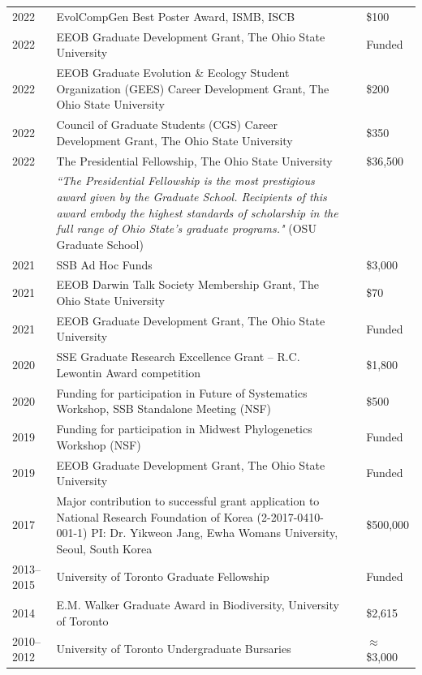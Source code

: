 \documentclass[11pt]{article}
\begin{document}
\begin{longtable}{p{}  p{} p{} p{} }%
2022 &	EvolCompGen Best Poster Award, ISMB, ISCB	& & \$100\\
2022 &	EEOB Graduate Development Grant, The Ohio State University	& & Funded\\
2022 &	EEOB Graduate Evolution \& Ecology Student Organization (GEES) Career Development Grant, The Ohio State University & & \$200\\
2022 & 	Council of Graduate Students (CGS) Career Development Grant, The Ohio State University & & \$350\\
2022 &	The Presidential Fellowship, The Ohio State University & & \$36,500\\
& \textit{``The Presidential Fellowship is the most prestigious award given by the Graduate School. Recipients of this award embody the highest standards of scholarship in the full range of Ohio State's graduate programs."} (OSU Graduate School) &&\\
2021 &	SSB Ad Hoc Funds	& & \$3,000\\
2021 &	EEOB Darwin Talk Society Membership Grant, The Ohio State University	& & \$70\\
2021 &	EEOB Graduate Development Grant, The Ohio State University	& & Funded\\
2020 &	SSE Graduate Research Excellence Grant – R.C. Lewontin Award competition	& & \$1,800 \\
2020 &	Funding for participation in Future of Systematics Workshop, SSB Standalone Meeting (NSF)	& & \$500\\
2019 &	Funding for participation in Midwest Phylogenetics Workshop (NSF)	& & Funded\\
2019 &	EEOB Graduate Development Grant, The Ohio State University	& & Funded\\
2017 &	Major contribution to successful grant application to 	National Research Foundation of Korea (2-2017-0410-001-1) PI: Dr. Yikweon Jang, Ewha Womans University, Seoul, South Korea	& & \ddag\$500,000\\
2013--2015 & University of Toronto Graduate Fellowship	& & Funded\\
2014 &	E.M. Walker Graduate Award in Biodiversity, University of Toronto	& & \dag\$2,615 \\
2010--2012 &	University of Toronto Undergraduate Bursaries	& & \dag$\approx$\$3,000 \\

\end{longtable}
\end{document}
